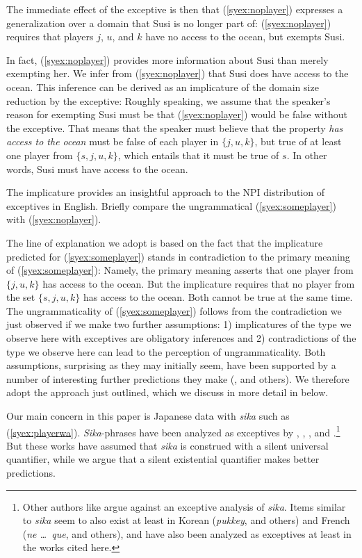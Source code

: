 \documentclass[output=paper]{langscibook}
\begin{document}
The immediate effect of the exceptive is then that (\ref{syex:noplayer}) expresses a generalization over a domain that Susi is no longer part of:
(\ref{syex:noplayer}) requires that players $j$, $u$, and $k$ have no access to the ocean, but exempts Susi.

In fact, (\ref{syex:noplayer}) provides more information about Susi than merely exempting her. We infer from (\ref{syex:noplayer}) that  Susi does have access to the ocean. This inference can be derived as an implicature of the domain size reduction by the exceptive: Roughly speaking, we assume that the speaker's reason for exempting Susi must be that (\ref{syex:noplayer}) would be false without the exceptive.  That means that the speaker must believe that the property \emph{has access to the ocean} must be false of each player in $\{j, u, k\}$, but true of at least one player from $\{s, j, u, k\}$, which entails that it must be true of $s$. In other words, Susi must have access to the ocean.

The implicature provides an insightful approach to the NPI distribution of exceptives in English.  Briefly compare the ungrammatical (\ref{syex:someplayer}) with (\ref{syex:noplayer}).  

\z

The line of explanation we adopt is based on the fact that the implicature predicted for (\ref{syex:someplayer}) stands in contradiction to the primary meaning of (\ref{syex:someplayer}): Namely, the primary meaning asserts that one player from $\{j, u, k\}$ has access to the ocean.  But the implicature requires that no player from the set $\{s, j, u, k\}$ has access to the ocean. Both cannot be true at the same time.  The ungrammaticality of (\ref{syex:someplayer}) follows from the contradiction we just observed if we make two further assumptions: 1) implicatures of the type we observe here with exceptives are obligatory inferences and 2) contradictions of the type we observe here can lead to the perception of ungrammaticality.  Both assumptions, surprising as they may initially seem, have been supported by a number of interesting further predictions they make (\citealt{chierchia13a}, and others).  We therefore adopt the approach just outlined, which we discuss in more detail in  below.

Our main concern in this paper is Japanese data with \emph{sika} such as (\ref{syex:playerwa}).
\emph{Sika}-phrases have been analyzed as exceptives by \citet{alonso-ovalle04a}, \citet{yoshimura2007b}, \citet{kawahara08a}, and \citet{shimoyama11}.\footnote{Other authors like \citet{hasegawa11a} argue against an exceptive analysis of \emph{sika}. Items similar to \emph{sika} seem to also exist at least in Korean (\emph{pukkey}, \citealt{sells01a} and others) and French (\emph{ne \dots\ que}, \citealt{fintel07a} and others), and have also been analyzed as exceptives at least in the works cited here.}  But these works have assumed that \emph{sika} is construed with a silent universal quantifier, while we argue that a silent existential quantifier makes better predictions.
\end{document}
